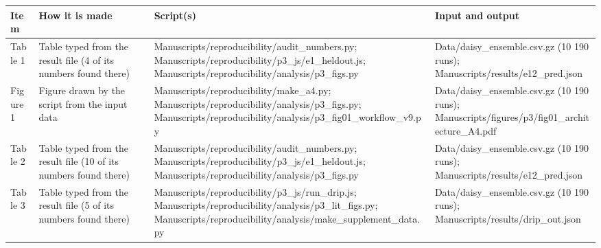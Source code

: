 {\scriptsize\begin{longtable}{p{}p{}p{}p{}}\toprule\textbf{Item} & \textbf{How it is made} & \textbf{Script(s)} & \textbf{Input and output}\\\midrule\endhead
{}Table 1 & Table typed from the result file (4 of its numbers found there) & Manuscripts/\allowbreak{}reproducibility/\allowbreak{}audit\_\allowbreak{}numbers.py;  Manuscripts/\allowbreak{}reproducibility/\allowbreak{}p3\_\allowbreak{}js/\allowbreak{}e1\_\allowbreak{}heldout.js;  Manuscripts/\allowbreak{}reproducibility/\allowbreak{}analysis/\allowbreak{}p3\_\allowbreak{}figs.py & Data/\allowbreak{}daisy\_\allowbreak{}ensemble.csv.gz (10 190 runs);  Manuscripts/\allowbreak{}results/\allowbreak{}e12\_\allowbreak{}pred.json\\
{}Figure 1 & Figure drawn by the script from the input data & Manuscripts/\allowbreak{}reproducibility/\allowbreak{}make\_\allowbreak{}a4.py;  Manuscripts/\allowbreak{}reproducibility/\allowbreak{}analysis/\allowbreak{}p3\_\allowbreak{}figs.py;  Manuscripts/\allowbreak{}reproducibility/\allowbreak{}analysis/\allowbreak{}p3\_\allowbreak{}fig01\_\allowbreak{}workflow\_\allowbreak{}v9.py & Data/\allowbreak{}daisy\_\allowbreak{}ensemble.csv.gz (10 190 runs);  Manuscripts/\allowbreak{}figures/\allowbreak{}p3/\allowbreak{}fig01\_\allowbreak{}architecture\_\allowbreak{}A4.pdf\\
{}Table 2 & Table typed from the result file (10 of its numbers found there) & Manuscripts/\allowbreak{}reproducibility/\allowbreak{}audit\_\allowbreak{}numbers.py;  Manuscripts/\allowbreak{}reproducibility/\allowbreak{}p3\_\allowbreak{}js/\allowbreak{}e1\_\allowbreak{}heldout.js;  Manuscripts/\allowbreak{}reproducibility/\allowbreak{}analysis/\allowbreak{}p3\_\allowbreak{}figs.py & Data/\allowbreak{}daisy\_\allowbreak{}ensemble.csv.gz (10 190 runs);  Manuscripts/\allowbreak{}results/\allowbreak{}e12\_\allowbreak{}pred.json\\
{}Table 3 & Table typed from the result file (5 of its numbers found there) & Manuscripts/\allowbreak{}reproducibility/\allowbreak{}p3\_\allowbreak{}js/\allowbreak{}run\_\allowbreak{}drip.js;  Manuscripts/\allowbreak{}reproducibility/\allowbreak{}analysis/\allowbreak{}p3\_\allowbreak{}lit\_\allowbreak{}figs.py;  Manuscripts/\allowbreak{}reproducibility/\allowbreak{}analysis/\allowbreak{}make\_\allowbreak{}supplement\_\allowbreak{}data.py & Data/\allowbreak{}daisy\_\allowbreak{}ensemble.csv.gz (10 190 runs);  Manuscripts/\allowbreak{}results/\allowbreak{}drip\_\allowbreak{}out.json\\

\end{longtable}}
